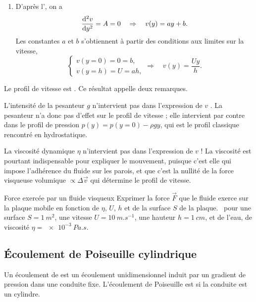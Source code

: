 \documentclass[12pt,fancy]{cours}
\begin{document}
\begin{enumerate}
\item D’après l’, on a
\begin{equation}
\frac{\mathrm{d}^2 v}{\mathrm{d} y^2}=A=0 \quad\Rightarrow \quad v(y)=ay+b.
\end{equation}
Les constantes $a$ et $b$ s’obtiennent
à partir des conditions aux limites sur la vitesse,
\begin{equation}
\begin{cases}
v(y=0)=0=b,\\
v(y=h)=U=ah,
\end{cases}
\Rightarrow  \quad \boxed{v(y)=\frac{Uy}{h}.}
\end{equation}
\end{enumerate}

Le profil de vitesse est . Ce résultat appelle deux remarques.
\begin{liste}
\item L’intensité de la pesanteur $g$ n'intervient pas dans l'expression de $v$ . La pesanteur n’a donc pas d’effet sur le profil de vitesse ; elle intervient par contre dans le profil de pression $p(y)= p(y=0)-\rho g y$, qui est le profil classique rencontré en hydrostatique.
\item
La viscosité dynamique $\eta$ n'intervient pas dans l'expression de $v$ ! La viscosité est pourtant indispensable pour expliquer le mouvement, puisque c’est elle qui impose l’adhérence du fluide sur les parois, et que c’est la nullité de la force visqueuse volumique $\propto \Delta \Vec{v}$ qui détermine le profil de vitesse.
\end{liste}

\begin{exemple}{Force exercée par un fluide visqueux}
	Exprimer la force $\Vec{F}$ que le fluide exerce sur la plaque mobile en fonction de $\eta$, $U$, $h$ et de la surface $S$ de la plaque. \AN~pour une surface $S=\SI{1}{m^2}$, une vitesse $U=\SI{10}{m.s^{-1}}$, une hauteur $h=\SI{1}{cm}$, et de l'eau, de viscosité $\eta=\SI{e-3}{Pa.s}$.
\end{exemple}
\examplesol{}



\subsection{Écoulement de Poiseuille cylindrique}
\label{sec:poiseuille}

\begin{definition}\label{def:couette}
	Un écoulement de  est un écoulement unidimensionnel induit par un gradient de pression dans une conduite fixe. 
L'écoulement de Poiseuille est  si la conduite est un cylindre.
\end{definition}
\end{document}
